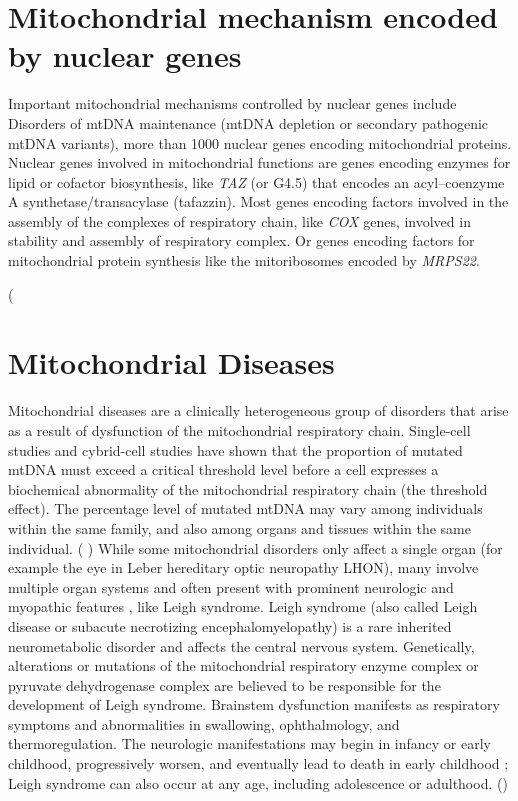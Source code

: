 \newline

\section{Mitochondrial mechanism encoded by nuclear genes}
Important mitochondrial mechanisms controlled by nuclear genes include
Disorders of mtDNA maintenance (mtDNA depletion or secondary pathogenic mtDNA variants), more than 1000 nuclear genes encoding mitochondrial proteins. Nuclear genes involved in mitochondrial functions are genes encoding enzymes for lipid or cofactor biosynthesis, like \textit{TAZ} (or G4.5) that encodes an acyl–coenzyme A synthetase/transacylase (tafazzin).
Most genes encoding factors involved in the assembly of the complexes of respiratory chain, like \textit{COX} genes, involved in stability and assembly of respiratory complex.
Or genes encoding factors for mitochondrial protein synthesis like the mitoribosomes encoded by \textit{MRPS22}.

(\cite{caggese1999identification} \cite{chinnery2014mitochondrial}


\section{Mitochondrial Diseases}
Mitochondrial diseases are a clinically heterogeneous group of disorders that arise as a result of dysfunction of
the mitochondrial respiratory chain.
Single-cell studies and cybrid-cell studies have shown that the proportion of mutated mtDNA must exceed a critical threshold level before a cell expresses a biochemical abnormality of the mitochondrial respiratory chain (the threshold effect). The percentage level of mutated mtDNA may vary among individuals within the same family, and also among organs and tissues within the same individual.
(\cite{chinnery2014mitochondrial} \cite{thorburn2017mitochondrial})
While some mitochondrial disorders only affect a single organ (for example the eye in Leber hereditary optic neuropathy LHON), many involve multiple organ systems and often present with prominent neurologic and myopathic features , like Leigh syndrome.
Leigh syndrome (also called Leigh disease or subacute necrotizing
encephalomyelopathy) is a rare inherited neurometabolic disorder
and affects the central nervous system. 
Genetically, alterations or mutations of the mitochondrial respiratory enzyme complex or pyruvate dehydrogenase complex are believed to be responsible for the development of Leigh syndrome.
Brainstem dysfunction manifests as respiratory symptoms and abnormalities in swallowing, ophthalmology, and thermoregulation. 
The neurologic manifestations may begin in infancy or early
childhood, progressively worsen, and eventually lead to death in
early childhood ; Leigh syndrome can also occur at any age, including adolescence or adulthood.
(\cite{chang2020meta})


